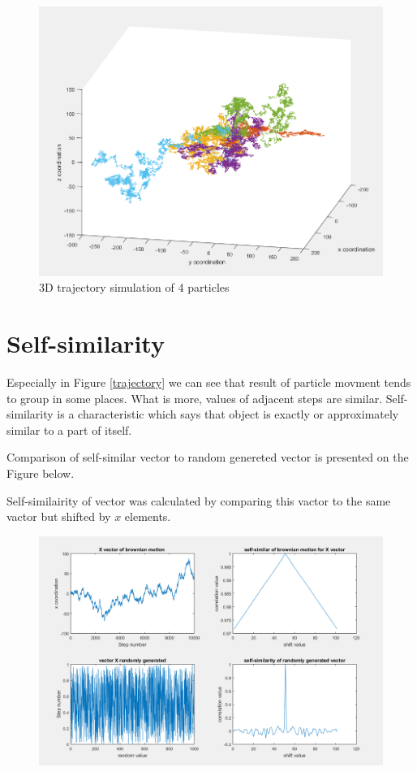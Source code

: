 \documentclass[a4paper,12pt]{article}
\begin{document}
\begin{figure}[H]
\caption{3D trajectory simulation of 4 particles}
\includegraphics[scale=0.7]{trajectories3d}
\centering
\end{figure}

\section{Self-similarity}
Especially in Figure \ref{trajectory} we can see that result of particle movment tends to group in some places. What is more, values of adjacent steps are similar. Self-similarity is a characteristic which says that object is exactly or approximately similar to a part of itself. 

Comparison of self-similar vector to random genereted vector is presented on the Figure below.

Self-similairity of vector was calculated by comparing this vactor to the same vactor but shifted by $x$ elements.
\begin{figure}[H]
\includegraphics[scale=0.6]{self-similarity}
\centering
\end{figure}
\end{document}
